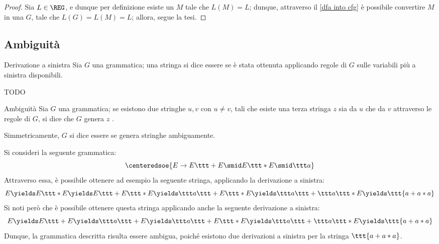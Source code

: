 \documentclass[a4paper, 12pt]{report}
\begin{document}
    \begin{proof}
        Sia $L \in \REG$, e dunque per definizione esiste un \DFA $M$ tale che  $L(M) = L$; dunque, attraverso il \cref{dfa into cfg} è possibile convertire $M$ in una \CFG $G$, tale che $L(G) = L(M) = L$; allora, segue la tesi.
    \end{proof}
   
    \subsection{Ambiguità}

    \begin{frameddefn}{Derivazione a sinistra}
        Sia $G$ una grammatica; una stringa si dice essere  se è stata ottenuta applicando regole di $G$ sulle variabili più a sinistra disponibili.
    \end{frameddefn}

    \begin{example}
        TODO
    \end{example}

    \begin{frameddefn}{Ambiguità}
        Sia $G$ una grammatica; se esistono due stringhe $u, v$ con $u \neq v$, tali che esiste una terza stringa $z$  sia da $u$ che da $v$ attraverso le regole di $G$, si dice che $G$ genera $z$ .

        Simmetricamente, $G$ si dice essere  se genera stringhe ambiguamente.
    \end{frameddefn}

    \begin{example}
        Si consideri la seguente grammatica: $$\centeredsoe{E \to E \ttt + E \smid E \ttt * E \smid \ttt a}$$ Attraverso essa, è possibile ottenere ad esempio la seguente stringa, applicando la derivazione a sinistra: $$E \yields E \ttt * E \yields E \ttt + E \ttt * E \yields \ttt a \ttt + E \ttt * E \yields \ttt a \ttt + \ttt a \ttt * E \yields \ttt{a+a*a}$$ Si noti però che è possibile ottenere questa stringa applicando anche la seguente derivazione a sinistra: $$E \yields E \ttt + E \yields \ttt a \ttt + E \yields \ttt a \ttt + E \ttt * E \yields \ttt a \ttt + \ttt a \ttt * E \yields \ttt{a+a*a}$$ Dunque, la grammatica descritta risulta essere ambigua, poiché esistono due derivazioni a sinistra per la stringa $\ttt{a+a*a}$.
    \end{example}
\end{document}
